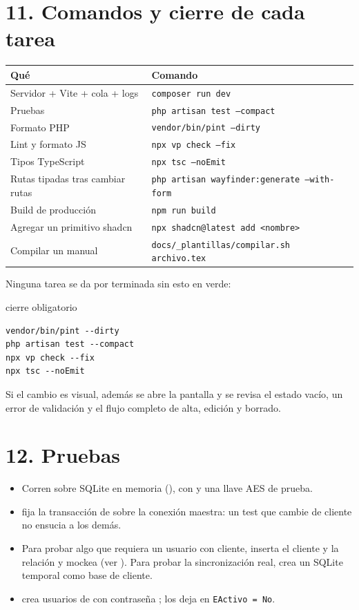 \documentclass[11pt]{article}
\newcommand{\cab}[2]{\rowcolor{tblhead}\textbf{\color{white}#1} & \textbf{\color{white}#2}\\ \hline}
\begin{document}
\section{11. Comandos y cierre de cada tarea}
\par\noindent\begin{tabularx}{\linewidth}{|>{\raggedright\arraybackslash}p{5.2cm}|>{\raggedright\arraybackslash}X|}
\hline
\cab{Qu\'e}{Comando}
Servidor + Vite + cola + logs & \texttt{composer run dev} \\
Pruebas & \texttt{php artisan test --compact} \\
Formato PHP & \texttt{vendor/bin/pint --dirty} \\
Lint y formato JS & \texttt{npx vp check --fix} \\
Tipos TypeScript & \texttt{npx tsc --noEmit} \\
Rutas tipadas tras cambiar rutas & \texttt{php artisan wayfinder:generate --with-form} \\
Build de producci\'on & \texttt{npm run build} \\
Agregar un primitivo shadcn & \texttt{npx shadcn@latest add <nombre>} \\
Compilar un manual & \texttt{docs/\_plantillas/compilar.sh archivo.tex} \\
\hline
\end{tabularx}\par\addvspace{6pt}

Ninguna tarea se da por terminada sin esto en verde:
\begin{termbox}{cierre obligatorio}
\begin{lstlisting}[style=plain]
vendor/bin/pint --dirty
php artisan test --compact
npx vp check --fix
npx tsc --noEmit
\end{lstlisting}
\end{termbox}
Si el cambio es visual, adem\'as se abre la pantalla y se revisa el estado vac\'io, un error de validaci\'on y el flujo completo de alta, edici\'on y borrado.

\section{12. Pruebas}
\begin{itemize}[leftmargin=1.2em,itemsep=2pt]
  \item Corren sobre SQLite en memoria (), con  y una llave AES de prueba.
  \item {} fija la transacci\'on de  sobre la conexi\'on maestra: un test que cambie de cliente no ensucia a los dem\'as.
  \item Para probar algo que requiera un usuario con cliente, inserta el cliente y la relaci\'on y mockea  (ver ). Para probar la sincronizaci\'on real,  crea un SQLite temporal como base de cliente.
  \item {} crea usuarios de  con contrase\~na ;  los deja en \texttt{EActivo = No}.
\end{itemize}
\end{document}

